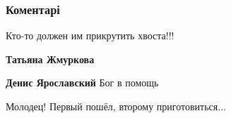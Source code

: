  
 
 
 
 
\subsubsection{Коментарі}
\label{sec:11_08_2021.fb.jaroslavskij_denis.1.policia_zajavlenie_maguchih.cmt}

\begin{itemize}

 
Кто-то должен им прикрутить хвоста!!!

\begin{itemize}
 
\textbf{Татьяна Жмуркова} 🤝

 
\textbf{Денис Ярославский} Бог в помощь

 
Молодец! Первый пошёл, второму приготовиться...

 

\end{itemize}
\end{itemize}
